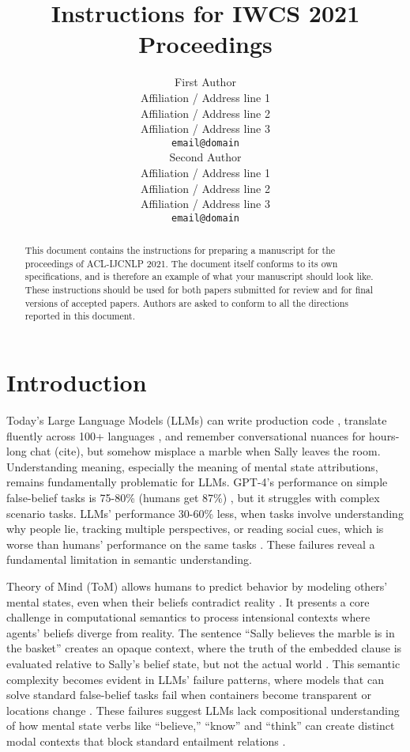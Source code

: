 \documentclass[11pt,a4paper]{article}
\title{Instructions for IWCS 2021 Proceedings}
\author{First Author \\
  Affiliation / Address line 1 \\
  Affiliation / Address line 2 \\
  Affiliation / Address line 3 \\
  \texttt{email@domain} \\\And
  Second Author \\
  Affiliation / Address line 1 \\
  Affiliation / Address line 2 \\
  Affiliation / Address line 3 \\
  \texttt{email@domain} \\}
\date{}
\begin{document}
\maketitle
\begin{abstract}
This document contains the instructions for preparing a manuscript for the proceedings of ACL-IJCNLP 2021.
The document itself conforms to its own specifications, and is therefore an example of what your manuscript should look like.
These instructions should be used for both papers submitted for review and for final versions of accepted papers.
Authors are asked to conform to all the directions reported in this document.
\end{abstract}

\section{Introduction}
Today's Large Language Models (LLMs) can write production code \cite{jiang2024surveylargelanguagemodels}, translate fluently across 100+ languages \cite{zhu2024multilingualmachinetranslationlarge}, and remember conversational nuances for hours-long chat (cite), but somehow misplace a marble when Sally leaves the room. Understanding meaning, especially the meaning of mental state attributions, remains fundamentally problematic for LLMs. GPT-4's performance on simple false-belief tasks is 75-80\% (humans get 87\%) \cite{moghaddam2023boostingtheoryofmindperformancelarge, Kosinski_2024}, but it struggles with complex scenario tasks. LLMs' performance 30-60\% less, when tasks involve understanding why people lie, tracking multiple perspectives, or reading social cues, which is worse than humans' performance on the same tasks \cite{sap-etal-2022-neural, kim-etal-2023-fantom}. These failures reveal a fundamental limitation in semantic understanding.


Theory of Mind (ToM) allows humans to predict behavior by modeling others' mental states, even when their beliefs contradict reality \cite{Premack_Woodruff_1978}. It presents a core challenge in computational semantics to process intensional contexts where agents' beliefs diverge from reality. The sentence ``Sally believes the marble is in the basket'' creates an opaque context, where the truth of the embedded clause is evaluated relative to Sally's belief state, but not the actual world \cite{Montague1973-MONTPT-4}. This semantic complexity becomes evident in LLMs' failure patterns, where models that can solve standard false-belief tasks fail when containers become transparent or locations change \cite{ullman2023largelanguagemodelsfail}. These failures suggest LLMs lack compositional understanding of how mental state verbs like ``believe,'' ``know'' and ``think'' can create distinct modal contexts that block standard entailment relations \cite{Karttunen73}.
\end{document}
